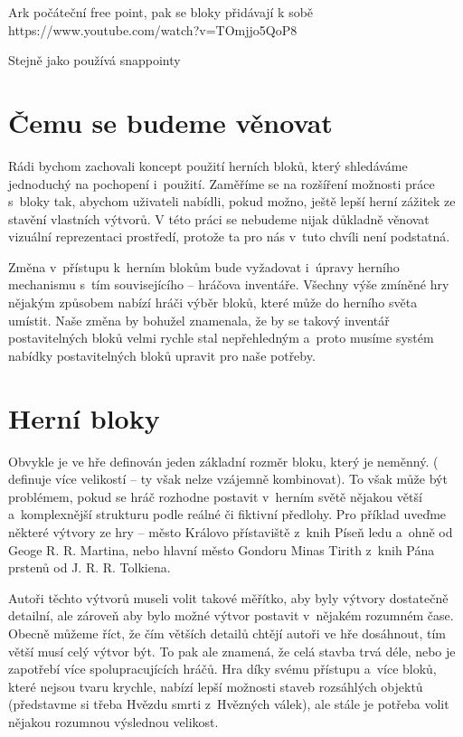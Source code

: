 \ARK{}
Ark počáteční free point, pak se bloky přidávají k sobě https://www.youtube.com/watch?v=TOmjjo5QoP8 


\NMS{}
Stejně jako \TM{} používá snappointy

\section{Čemu se budeme věnovat}

Rádi bychom zachovali koncept použití herních bloků, který shledáváme jednoduchý na pochopení i~použití. Zaměříme se na rozšíření možnosti práce s~bloky tak, abychom uživateli nabídli, pokud možno, ještě lepší herní zážitek ze stavění vlastních výtvorů. V této práci se nebudeme nijak důkladně věnovat vizuální reprezentaci prostředí, protože ta pro nás v~tuto chvíli není podstatná. 

Změna v~přístupu k~herním blokům bude vyžadovat i~úpravy herního mechanismu s~tím souvisejícího -- hráčova inventáře. Všechny výše zmíněné hry nějakým způsobem nabízí hráči výběr bloků, které může do herního světa umístit. Naše změna by bohužel znamenala, že by se takový inventář postavitelných bloků velmi rychle stal nepřehledným a~proto musíme systém nabídky postavitelných bloků upravit pro naše potřeby.

\section{Herní bloky}



Obvykle je ve hře definován jeden základní rozměr bloku, který je neměnný. (\SE{} definuje více velikostí -- ty však nelze vzájemně kombinovat). To však může být problémem, pokud se hráč rozhodne postavit v~herním světě nějakou větší a~komplexnější strukturu podle reálné či fiktivní předlohy. Pro příklad uveďme některé výtvory ze hry \MC{} -- město Královo přístaviště z~knih Píseň ledu a~ohně od Geoge R. R. Martina, nebo hlavní město Gondoru Minas Tirith z~knih Pána prstenů od J. R. R. Tolkiena.

Autoři těchto výtvorů museli volit takové měřítko, aby byly výtvory dostatečně detailní, ale zároveň aby bylo možné výtvor postavit v~nějakém rozumném čase. Obecně můžeme říct, že čím větších detailů chtějí autoři ve hře \MC{} dosáhnout, tím větší musí celý výtvor být. To pak ale znamená, že celá stavba trvá déle, nebo je zapotřebí více spolupracujících hráčů. Hra \SE{} díky svému přístupu a~více bloků, které nejsou tvaru krychle, nabízí lepší možnosti staveb rozsáhlých objektů (představme si třeba Hvězdu smrti z~Hvězných válek), ale stále je potřeba volit nějakou rozumnou výslednou velikost.


